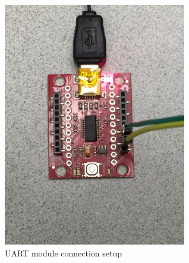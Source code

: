 \begin{figure}[h]
\caption{UART module connection setup}
\label{uart}
\includegraphics[width=8cm]{./fig/UART.jpg}
\centering
\end{figure}

\clearpage






